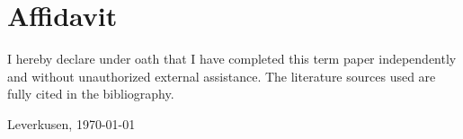 \chapter*{Affidavit}

I hereby declare under oath that I have completed this term paper independently and without unauthorized external assistance. The literature sources used are fully cited in the bibliography.

\vspace{6cm}
Leverkusen, \today
